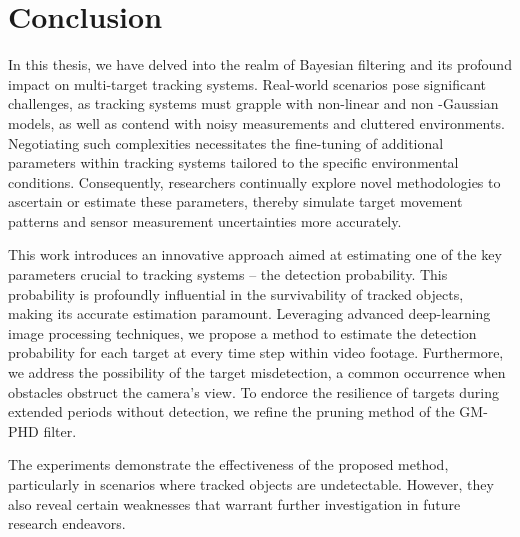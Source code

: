 \chapter{Conclusion}
%
%

In this thesis, we have delved into the realm of Bayesian filtering and its profound impact on multi-target tracking
systems. Real-world scenarios pose significant challenges, as tracking systems must grapple with non-linear and non
-Gaussian models, as well as contend with noisy measurements and cluttered environments. Negotiating such complexities necessitates the fine-tuning of additional parameters within tracking systems tailored to the specific environmental conditions. Consequently, researchers continually explore novel methodologies to ascertain or estimate these parameters, thereby simulate target movement patterns and sensor measurement uncertainties more accurately.

This work introduces an innovative approach aimed at estimating one of the key parameters crucial to tracking systems --
the detection probability. This probability is profoundly influential in the survivability of tracked objects, making
its
accurate
estimation paramount. Leveraging advanced deep-learning image processing techniques, we propose a method to estimate
the detection probability for each target at every time step within video footage. Furthermore, we address the
possibility of the target misdetection, a common occurrence when obstacles obstruct the camera's view. To endorce the
resilience of targets during extended periods without detection, we refine the pruning method of the GM-PHD filter.

The experiments demonstrate the effectiveness of the proposed method, particularly in scenarios where tracked objects are undetectable. However, they also reveal certain weaknesses that warrant further investigation in future research endeavors.




